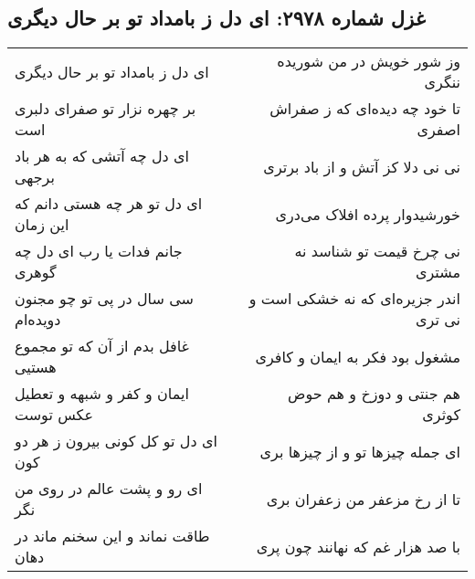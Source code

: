 \begin{center}
\section*{غزل شماره ۲۹۷۸: ای دل ز بامداد تو بر حال دیگری}
\label{sec:2978}
\begin{longtable}{l p{0.5cm} r}
ای دل ز بامداد تو بر حال دیگری
&&
وز شور خویش در من شوریده ننگری
\\
بر چهره نزار تو صفرای دلبری است
&&
تا خود چه دیده‌ای که ز صفراش اصفری
\\
ای دل چه آتشی که به هر باد برجهی
&&
نی نی دلا کز آتش و از باد برتری
\\
ای دل تو هر چه هستی دانم که این زمان
&&
خورشیدوار پرده افلاک می‌دری
\\
جانم فدات یا رب ای دل چه گوهری
&&
نی چرخ قیمت تو شناسد نه مشتری
\\
سی سال در پی تو چو مجنون دویده‌ام
&&
اندر جزیره‌ای که نه خشکی است و نی تری
\\
غافل بدم از آن که تو مجموع هستیی
&&
مشغول بود فکر به ایمان و کافری
\\
ایمان و کفر و شبهه و تعطیل عکس توست
&&
هم جنتی و دوزخ و هم حوض کوثری
\\
ای دل تو کل کونی بیرون ز هر دو کون
&&
ای جمله چیزها تو و از چیزها بری
\\
ای رو و پشت عالم در روی من نگر
&&
تا از رخ مزعفر من زعفران بری
\\
طاقت نماند و این سخنم ماند در دهان
&&
با صد هزار غم که نهانند چون پری
\\
\end{longtable}
\end{center}
